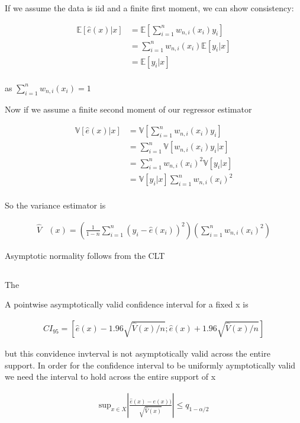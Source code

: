 \documentclass[12pt]{article}
\newcommand{\E}{\mathbb{E}}
\newcommand{\V}{\mathbb{V}}
\newcommand{\qsum}{\sum\limits_{i=1}^n}
\begin{document}
If we assume the data is iid and a finite first moment, we can show consistency:

\begin{align*}
\E[\hat{e}(x) | x] &= \E\left[\qsum w_{n,i}(x_i)y_i\right]\\
&= \qsum w_{n,i}(x_i)\E[y_i | x ]\\
&= \E[y_i | x ]\\
\end{align*}

as $ \qsum w_{n,i}(x_i) = 1 $


Now if we assume a finite second moment of our regressor estimator

\begin{align*}
\V[\hat{e}(x) | x] &= \V \left[\qsum w_{n,i}(x_i)y_i\right]\\
&= \qsum \V[w_{n,i}(x_i)y_i | x ]\\
&= \qsum w_{n,i}(x_i)^2 \V[y_i | x ]\\
&= \V[y_i | x ] \qsum w_{n,i}(x_i)^2 \\
\end{align*}


So the variance estimator is

\begin{align*}
\hat{V}&(x) = \left(\frac{1}{1-n} \qsum (y_i - \hat{e}(x_i))^2 \right) \left( \qsum w_{n,i}(x_i)^2\right)
\end{align*}

Asymptotic normality follows from the CLT

\subsection{}

The

A pointwise asymptotically valid confidence interval for a fixed x is

\begin{gather*}
CI_{95} = \left[\hat{e}(x)  - 1.96  \sqrt{\hat{V}(x) / n}  ; \hat{e}(x)  + 1.96  \sqrt{\hat{V}(x) / n}  \right]
\end{gather*}

but this convidence invterval is not asymptotically valid across the entire support. In order for the confidence interval to be uniformly aymptotically valid we need the interval to hold across the entire support of x

\begin{gather*}
  \text{sup}_{x\in X} \left| \frac{\hat{e}(x) - e(x))}{\sqrt{\hat{V}(x)}} \right| \leq q_{1-\alpha/2}
\end{gather*}
\end{document}
